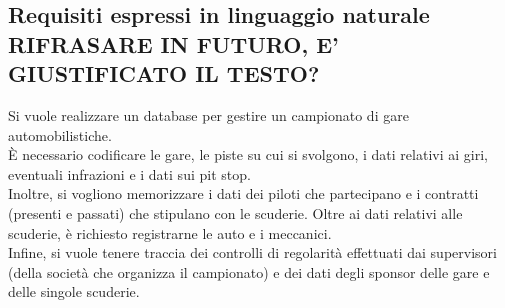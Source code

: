 \documentclass[11pt]{article}
\begin{document}
\subsection{Requisiti espressi in linguaggio naturale \textbf{RIFRASARE IN FUTURO, E' GIUSTIFICATO IL TESTO?}}
Si vuole realizzare un database per gestire un campionato di gare automobilistiche. \\
È necessario codificare le gare, le piste su cui si svolgono, i dati relativi ai giri, eventuali infrazioni e i dati sui pit stop. \\
Inoltre, si vogliono memorizzare i dati dei piloti che partecipano e i contratti (presenti e passati) che stipulano con le scuderie. Oltre ai dati relativi alle scuderie, è richiesto registrarne le auto e i meccanici. \\
Infine, si vuole tenere traccia dei controlli di regolarità effettuati dai supervisori (della società che organizza il campionato) e dei dati degli sponsor delle gare e delle singole scuderie. \\[1em]
\end{document}
